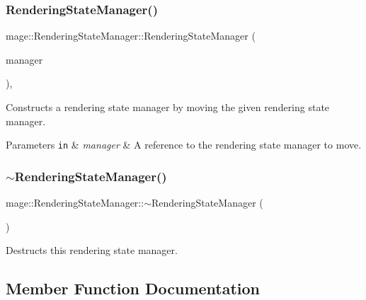 \subsubsection{\texorpdfstring{Rendering\+State\+Manager()}{RenderingStateManager()}\hspace{0.1cm}{\footnotesize\ttfamily [3/3]}}
{\footnotesize\ttfamily mage\+::\+Rendering\+State\+Manager\+::\+Rendering\+State\+Manager (\begin{DoxyParamCaption}\item[{\hyperlink{classmage_1_1_rendering_state_manager}{Rendering\+State\+Manager} \&\&}]{manager }\end{DoxyParamCaption})\hspace{0.3cm}{\ttfamily [default]}, {\ttfamily [noexcept]}}

Constructs a rendering state manager by moving the given rendering state manager.


\begin{DoxyParams}[1]{Parameters}
\mbox{\tt in}  & {\em manager} & A reference to the rendering state manager to move. \\
\hline
\end{DoxyParams}
\hypertarget{classmage_1_1_rendering_state_manager_ad4865219aaaac55dd53c4ab51af8d63f}{}\label{classmage_1_1_rendering_state_manager_ad4865219aaaac55dd53c4ab51af8d63f} 
\subsubsection{\texorpdfstring{$\sim$\+Rendering\+State\+Manager()}{~RenderingStateManager()}}
{\footnotesize\ttfamily mage\+::\+Rendering\+State\+Manager\+::$\sim$\+Rendering\+State\+Manager (\begin{DoxyParamCaption}{ }\end{DoxyParamCaption})\hspace{0.3cm}{\ttfamily [default]}}

Destructs this rendering state manager. 

\subsection{Member Function Documentation}
\hypertarget{classmage_1_1_rendering_state_manager_a0ae04882682ccccd4e75830bd2b4159b}{}\label{classmage_1_1_rendering_state_manager_a0ae04882682ccccd4e75830bd2b4159b} 
